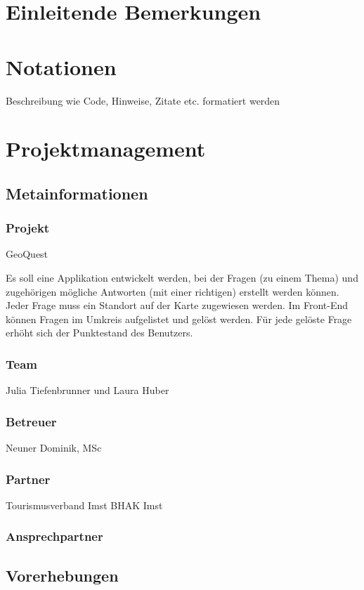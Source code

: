\def \currentAuthor {Gabi Sorglos} %

\chapter*{Einleitende Bemerkungen}

\chapter*{Notationen}
Beschreibung wie Code, Hinweise, Zitate etc. formatiert werden  

\chapter{Projektmanagement}

\section{Metainformationen}
\subsection{Projekt}
GeoQuest

Es soll eine Applikation entwickelt werden, bei der Fragen (zu einem Thema) und zugehörigen mögliche Antworten (mit einer richtigen) erstellt werden können. Jeder Frage muss ein Standort auf der Karte zugewiesen werden. 
Im Front-End können Fragen im Umkreis aufgelistet und gelöst werden. Für jede gelöste Frage erhöht sich der Punktestand des Benutzers.
\subsection{Team}
Julia Tiefenbrunner und Laura Huber
\subsection{Betreuer}
Neuner Dominik, MSc
\subsection{Partner}
Tourismusverband Imst
BHAK Imst
\subsection{Ansprechpartner}
\section{Vorerhebungen}
